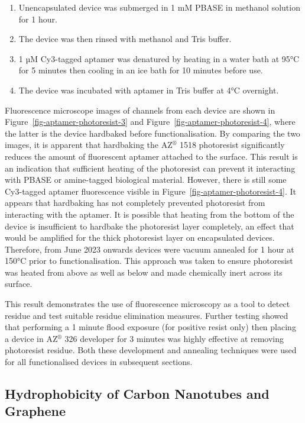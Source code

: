 \documentclass[
  a4paper,
]{scrbook}
\begin{document}
\begin{enumerate}
\def\labelenumi{\arabic{enumi}.}
\item
  Unencapsulated device was submerged in 1 mM PBASE in methanol solution
  for 1 hour.
\item
  The device was then rinsed with methanol and Tris buffer.
\item
  1 µM Cy3-tagged aptamer was denatured by heating in a water bath at
  95°C for 5 minutes then cooling in an ice bath for 10 minutes before
  use.
\item
  The device was incubated with aptamer in Tris buffer at 4°C overnight.
\end{enumerate}

Fluorescence microscope images of channels from each device are shown in
Figure~\ref{fig-aptamer-photoresist-3} and
Figure~\ref{fig-aptamer-photoresist-4}, where the latter is the device
hardbaked before functionalisation. By comparing the two images, it is
apparent that hardbaking the AZ\(^\circledR\) 1518 photoresist
significantly reduces the amount of fluorescent aptamer attached to the
surface. This result is an indication that sufficient heating of the
photoresist can prevent it interacting with PBASE or amine-tagged
biological material. However, there is still some Cy3-tagged aptamer
fluorescence visible in Figure~\ref{fig-aptamer-photoresist-4}. It
appears that hardbaking has not completely prevented photoresist from
interacting with the aptamer. It is possible that heating from the
bottom of the device is insufficient to hardbake the photoresist layer
completely, an effect that would be amplified for the thick photoresist
layer on encapsulated devices. Therefore, from June 2023 onwards devices
were vacuum annealed for 1 hour at 150°C prior to functionalisation.
This approach was taken to ensure photoresist was heated from above as
well as below and made chemically inert across its surface.

This result demonstrates the use of fluorescence microscopy as a tool to
detect residue and test suitable residue elimination measures. Further
testing showed that performing a 1 minute flood exposure (for positive
resist only) then placing a device in AZ\(^\circledR\) 326 developer for
3 minutes was highly effective at removing photoresist residue. Both
these development and annealing techniques were used for all
functionalised devices in subsequent sections.

\hypertarget{sec-hydrophobicity}{%
\subsection{Hydrophobicity of Carbon Nanotubes and
Graphene}\label{sec-hydrophobicity}}
\end{document}
